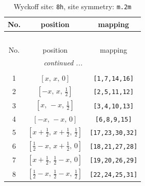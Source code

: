 \documentclass[fleqn,8pt]{jsarticle}
\begin{document}
\begin{longtable}{ccc}
\caption{Wyckoff site: {\tt 8h}, site symmetry: {\tt m.2m}}
 \\
 \hline \hline
No. & position & mapping \\ \hline \endfirsthead

\multicolumn{2}{l}{\tablename\ \thetable{}} \\
 \hline \hline
No. & position & mapping \\ \hline \endhead

 \hline \hline
\multicolumn{2}{r}{\footnotesize\it continued ...} \\ \endfoot

 \hline \hline
\multicolumn{2}{r}{} \\ \endlastfoot

1 & $\left[ x,\, x,\, 0 \right]$ & {\tt [1,7,14,16]} \\ \hline
2 & $\left[ - x,\, x,\, \frac{1}{2} \right]$ & {\tt [2,5,11,12]} \\ \hline
3 & $\left[ x,\, - x,\, \frac{1}{2} \right]$ & {\tt [3,4,10,13]} \\ \hline
4 & $\left[ - x,\, - x,\, 0 \right]$ & {\tt [6,8,9,15]} \\ \hline
5 & $\left[ x + \frac{1}{2},\, x + \frac{1}{2},\, \frac{1}{2} \right]$ & {\tt [17,23,30,32]} \\ \hline
6 & $\left[ \frac{1}{2} - x,\, x + \frac{1}{2},\, 0 \right]$ & {\tt [18,21,27,28]} \\ \hline
7 & $\left[ x + \frac{1}{2},\, \frac{1}{2} - x,\, 0 \right]$ & {\tt [19,20,26,29]} \\ \hline
8 & $\left[ \frac{1}{2} - x,\, \frac{1}{2} - x,\, \frac{1}{2} \right]$ & {\tt [22,24,25,31]} \\
\end{longtable}
\renewcommand{\arraystretch}{1.2}
\end{document}
